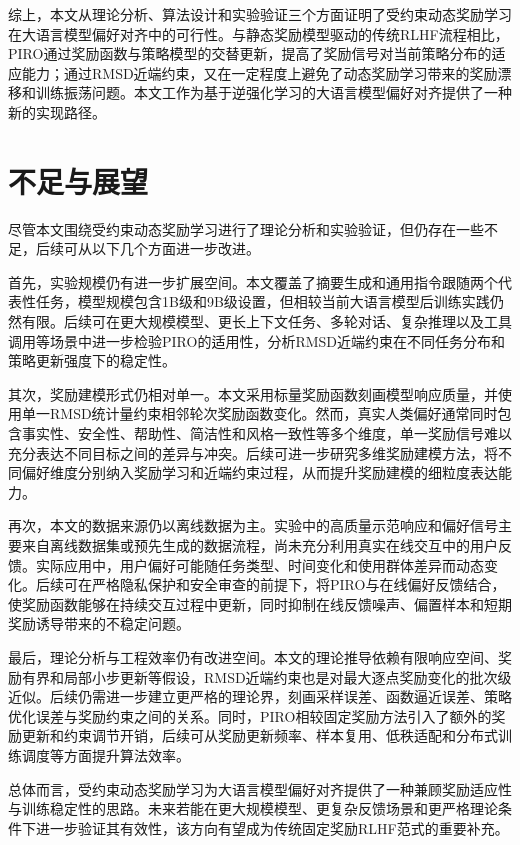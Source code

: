 综上，本文从理论分析、算法设计和实验验证三个方面证明了受约束动态奖励学习在大语言模型偏好对齐中的可行性。与静态奖励模型驱动的传统RLHF流程相比，PIRO通过奖励函数与策略模型的交替更新，提高了奖励信号对当前策略分布的适应能力；通过RMSD近端约束，又在一定程度上避免了动态奖励学习带来的奖励漂移和训练振荡问题。本文工作为基于逆强化学习的大语言模型偏好对齐提供了一种新的实现路径。

\section{不足与展望}

尽管本文围绕受约束动态奖励学习进行了理论分析和实验验证，但仍存在一些不足，后续可从以下几个方面进一步改进。

首先，实验规模仍有进一步扩展空间。本文覆盖了摘要生成和通用指令跟随两个代表性任务，模型规模包含1B级和9B级设置，但相较当前大语言模型后训练实践仍然有限。后续可在更大规模模型、更长上下文任务、多轮对话、复杂推理以及工具调用等场景中进一步检验PIRO的适用性，分析RMSD近端约束在不同任务分布和策略更新强度下的稳定性。

其次，奖励建模形式仍相对单一。本文采用标量奖励函数刻画模型响应质量，并使用单一RMSD统计量约束相邻轮次奖励函数变化。然而，真实人类偏好通常同时包含事实性、安全性、帮助性、简洁性和风格一致性等多个维度，单一奖励信号难以充分表达不同目标之间的差异与冲突。后续可进一步研究多维奖励建模方法，将不同偏好维度分别纳入奖励学习和近端约束过程，从而提升奖励建模的细粒度表达能力。

再次，本文的数据来源仍以离线数据为主。实验中的高质量示范响应和偏好信号主要来自离线数据集或预先生成的数据流程，尚未充分利用真实在线交互中的用户反馈。实际应用中，用户偏好可能随任务类型、时间变化和使用群体差异而动态变化。后续可在严格隐私保护和安全审查的前提下，将PIRO与在线偏好反馈结合，使奖励函数能够在持续交互过程中更新，同时抑制在线反馈噪声、偏置样本和短期奖励诱导带来的不稳定问题。

最后，理论分析与工程效率仍有改进空间。本文的理论推导依赖有限响应空间、奖励有界和局部小步更新等假设，RMSD近端约束也是对最大逐点奖励变化的批次级近似。后续仍需进一步建立更严格的理论界，刻画采样误差、函数逼近误差、策略优化误差与奖励约束之间的关系。同时，PIRO相较固定奖励方法引入了额外的奖励更新和约束调节开销，后续可从奖励更新频率、样本复用、低秩适配和分布式训练调度等方面提升算法效率。

总体而言，受约束动态奖励学习为大语言模型偏好对齐提供了一种兼顾奖励适应性与训练稳定性的思路。未来若能在更大规模模型、更复杂反馈场景和更严格理论条件下进一步验证其有效性，该方向有望成为传统固定奖励RLHF范式的重要补充。
